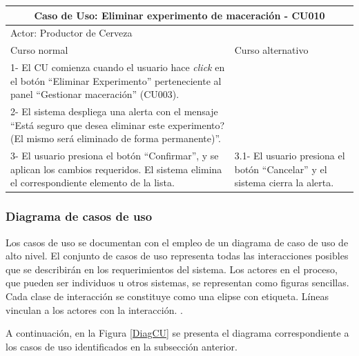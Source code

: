 \begin{longtable}{|p{7cm}|p{7cm}|}
        \hline
        \multicolumn{2}{|c|}{\textbf{Caso de Uso: Eliminar experimento de maceración - CU010}} \\
        \hline
        \multicolumn{2}{|l|}{Actor: Productor de Cerveza} \\
        \hline
        Curso normal & Curso alternativo \\
        \hline
        1- El CU comienza cuando el usuario hace \textit{click} en el botón ``Eliminar Experimento'' perteneciente al panel ``Gestionar maceración'' (CU003). & \\
        \hline
        2- El sistema despliega una alerta con el mensaje ``Está seguro que desea eliminar este experimento? (El mismo será eliminado de forma permanente)''. &
        \\
        \hline
        3- El usuario presiona el botón ``Confirmar'', y se aplican los cambios requeridos. El sistema elimina el correspondiente elemento de la lista. & 3.1- El usuario presiona el botón ``Cancelar'' y el sistema cierra la alerta.
        \\
        \hline

 \end{longtable}
    
      \subsubsection{Diagrama de casos de uso}
      \par
      Los casos de uso se documentan con el empleo de un diagrama de caso de uso de alto nivel. El conjunto de casos de uso representa todas las interacciones posibles que se describirán en los requerimientos del sistema. Los actores en el proceso, que pueden ser individuos u otros sistemas, se representan como figuras sencillas. Cada clase de interacción se constituye como una elipse con etiqueta. Líneas vinculan a los actores con la interacción. \cite{Som05}.
      \par
      A continuación, en la Figura \ref{DiagCU} se presenta el diagrama correspondiente a los casos de uso identificados en la subsección anterior.\\
      
